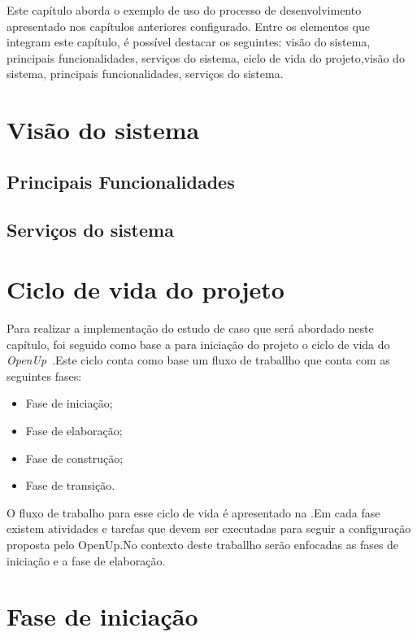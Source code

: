 Este capítulo aborda o exemplo de uso do processo de desenvolvimento apresentado nos capítulos anteriores configurado. Entre os elementos que integram este capítulo, é possível destacar os seguintes: visão do sistema, principais funcionalidades, serviços do sistema, ciclo de vida do projeto,visão do sistema, principais funcionalidades, serviços do sistema.

\section{Visão do sistema}

\subsection{Principais Funcionalidades}
\subsection{Serviços do sistema}

\section{Ciclo de vida do projeto}

Para realizar a implementação do estudo de caso que será abordado neste capítulo, foi seguido como base a para iniciação do projeto o ciclo de vida do \emph{OpenUp}~\cite{openup}.Este ciclo conta como base um fluxo de traballho que conta com as seguintes fases:
\begin{itemize}
    \item Fase de iniciação;
    \item Fase de elaboração;
    \item Fase de construção;
    \item Fase de transição.
\end{itemize}

%

O fluxo de trabalho para esse ciclo de vida é apresentado na .Em cada fase existem atividades e tarefas que devem ser executadas para seguir a configuração proposta pelo OpenUp.No contexto deste traballho serão enfocadas as fases de iniciação e a fase de elaboração.

\section{Fase de iniciação}

